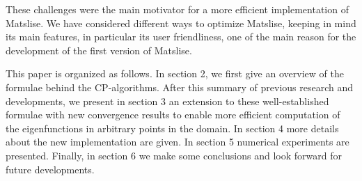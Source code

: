 
%
%



These challenges were the main motivator for a more efficient
implementation of Matslise. We have considered different ways to
optimize Matslise, keeping in mind its main features, in particular its user friendliness,
one of the main reason for the development of the first version of Matslise.



This paper is organized as follows. In section 2, we first give an overview of the formulae behind the CP-algorithms. After this summary of previous research and developments, we present in section 3 an extension to these well-established formulae with new convergence results to enable more efficient computation of the eigenfunctions in arbitrary points in the domain.
In section 4 more details about the new implementation are given.
In section 5 numerical experiments are presented. %
Finally, in section 6 we make some conclusions and look forward for future developments.

